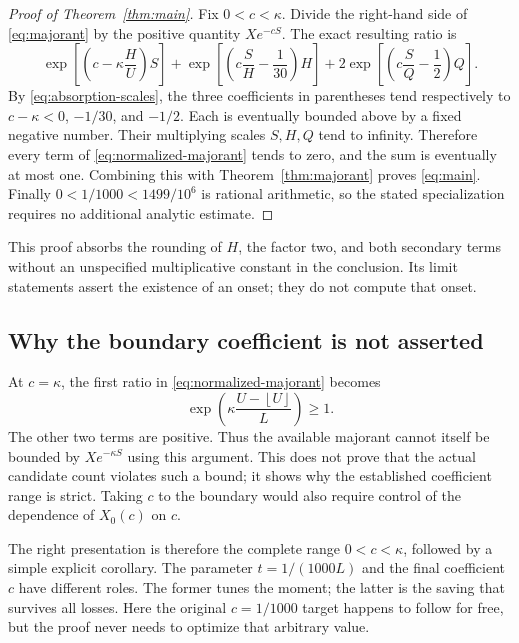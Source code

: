 \documentclass[11pt,a4paper]{article}
\theoremstyle{definition}
\theoremstyle{remark}
\numberwithin{equation}{section}
\newcommand{\rate}{\kappa}
\newcommand{\floor}[1]{\left\lfloor #1\right\rfloor}
\begin{document}
\begin{proof}[Proof of Theorem~\ref{thm:main}]
Fix $0<c<\rate$. Divide the right-hand side of \eqref{eq:majorant} by the
positive quantity $Xe^{-cS}$. The exact resulting ratio is
\begin{equation}\label{eq:normalized-majorant}
 \exp\!\left[\left(c-\rate\frac HU\right)S\right]
 +\exp\!\left[\left(c\frac SH-\frac1{30}\right)H\right]
 +2\exp\!\left[\left(c\frac SQ-\frac12\right)Q\right].
\end{equation}
By \eqref{eq:absorption-scales}, the three coefficients in parentheses tend
respectively to $c-\rate<0$, $-1/30$, and $-1/2$. Each is eventually bounded
above by a fixed negative number. Their multiplying scales $S,H,Q$ tend to
infinity. Therefore every term of \eqref{eq:normalized-majorant} tends to
zero, and the sum is eventually at most one. Combining this with
Theorem~\ref{thm:majorant} proves \eqref{eq:main}. Finally
$0<1/1000<1499/10^6$ is rational arithmetic, so the stated specialization
requires no additional analytic estimate.
\end{proof}
This proof absorbs the rounding of $H$, the factor two, and both secondary
terms without an unspecified multiplicative constant in the conclusion.
Its limit statements assert the existence of an onset; they do not compute
that onset.

\subsection{Why the boundary coefficient is not asserted}
At $c=\rate$, the first ratio in \eqref{eq:normalized-majorant} becomes
\begin{equation}\label{eq:boundary-ratio}
 \exp\!\left(\rate\frac{U-\floor U}{L}\right)\ge1.
\end{equation}
The other two terms are positive. Thus the available majorant cannot itself
be bounded by $Xe^{-\rate S}$ using this argument. This does not prove that the
actual candidate count violates such a bound; it shows why the established
coefficient range is strict. Taking $c$ to the boundary would also require
control of the dependence of $X_0(c)$ on $c$.

The right presentation is therefore the complete range $0<c<\rate$, followed
by a simple explicit corollary. The parameter $t=1/(1000L)$ and the final
coefficient $c$ have different roles. The former tunes the moment; the latter
is the saving that survives all losses. Here the original $c=1/1000$ target
happens to follow for free, but the proof never needs to optimize that
arbitrary value.
\end{document}
